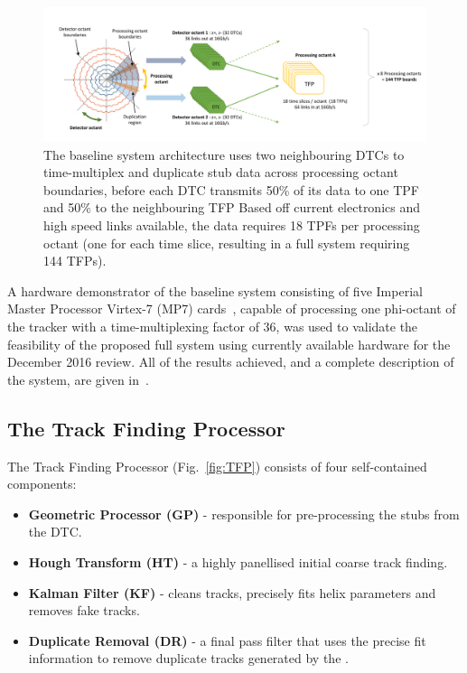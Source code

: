 \begin{figure}[t]
\centering
\includegraphics[width=1.00\textwidth]{figs/tk-upgrade/tmttarch.pdf}
\caption{The baseline system architecture uses two neighbouring DTCs to time-multiplex and duplicate stub data across processing octant boundaries, before each DTC transmits 50\% of its data to one TPF and 50\% to the neighbouring TFP Based off current electronics and high speed links available, the data requires 18 TPFs per processing octant (one for each time slice, resulting in a full system requiring 144 TFPs).}
\label{fig:tmttarch}
\end{figure}

A hardware demonstrator of the baseline system consisting of five Imperial Master Processor Virtex-7 (MP7) cards~\cite{mp7ref}, capable of processing one phi-octant of the tracker with a time-multiplexing factor of 36, was used to validate the feasibility of the proposed full system using currently available hardware for the December 2016 review.
All of the results achieved, and a complete description of the system, are given in~\cite{TMTT_JINST}.

\subsection{The Track Finding Processor}\label{subsec:TFF}
The Track Finding Processor (Fig.~\ref{fig:TFP}) consists of four self-contained components:
\begin{itemize}
\item {\bf Geometric Processor (GP)} - responsible for pre-processing the stubs from the DTC.
\item {\bf Hough Transform (HT)} - a highly panellised initial coarse track finding.
\item {\bf Kalman Filter (KF)} - cleans tracks, precisely fits helix parameters and removes fake tracks.
\item {\bf Duplicate Removal (DR)} - a final pass filter that uses the precise fit information to remove duplicate tracks generated by the \HT.
\end{itemize}

